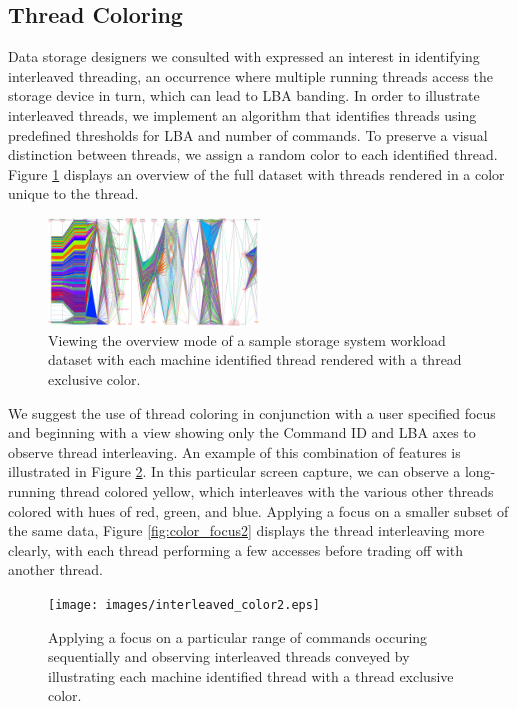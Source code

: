\documentclass[journal]{vgtc}                %
\begin{document}
\subsection{Thread Coloring}
Data storage designers we consulted with expressed an interest in identifying interleaved threading, an occurrence where multiple running threads access the storage device in turn, which can lead to LBA banding. In order to illustrate interleaved threads, we implement an algorithm that identifies threads using predefined thresholds for LBA and number of commands. To preserve a visual distinction between threads, we assign a random color to each identified thread. Figure \ref{fig:color_overview} displays an overview of the full dataset with threads rendered in a color unique to the thread.

\begin{figure}[h!]
 \centering
 \includegraphics[width=0.5\textwidth]{images/color_overview.eps}
 \caption[Identified threads rendered with a thread exclusive color.]{Viewing the overview mode of a sample storage system workload dataset with each machine identified thread rendered with a thread exclusive color.}
 \label{fig:color_overview}
\end{figure}

We suggest the use of thread coloring in conjunction with a user specified focus and beginning with a view showing only the Command ID and LBA axes to observe thread interleaving. An example of this combination of features is illustrated in Figure \ref{fig:color_focus1}. In this particular screen capture, we can observe a long-running thread colored yellow, which interleaves with the various other threads colored with hues of red, green, and blue. Applying a focus on a smaller subset of the same data, Figure \ref{fig:color_focus2} displays the thread interleaving more clearly, with each thread performing a few accesses before trading off with another thread.

\begin{figure}[h!]
 \centering
 \texttt{[image: images/interleaved\_color2.eps]}
 \caption[Identified threads rendered with a thread exclusive color.]{Applying a focus on a particular range of commands occuring sequentially and observing interleaved threads conveyed by illustrating each machine identified thread with a thread exclusive color.}
 \label{fig:color_focus1}
\end{figure}
\end{document}
